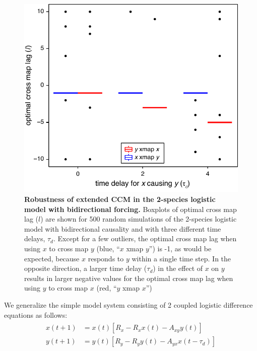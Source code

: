 \begin{figure}[!ht]
\begin{center}\includegraphics{fig_lag_2sp_delay_rand.pdf}\end{center}
\caption[Robustness of extended CCM in the 2-species logistic model with bidirectional forcing.]{\textbf{Robustness of extended CCM in the 2-species logistic model with bidirectional forcing.}\newline
Boxplots of optimal cross map lag ($l$) are shown for 500 random simulations of the 2-species logistic model with bidirectional causality and with three different time delays, $\tau_d$. Except for a few outliers, the optimal cross map lag when using $x$ to cross map $y$ (blue, ``$x$ xmap $y$'') is -1, as would be expected, because $x$ responds to $y$ within a single time step. In the opposite direction, a larger time delay ($\tau_d$) in the effect of $x$ on $y$ results in larger negative values for the optimal cross map lag when using $y$ to cross map $x$ (red, ``$y$ xmap $x$'')}
\label{fig_lag_2sp_delay_rand}
\end{figure}

We generalize the simple model system consisting of 2 coupled logistic difference equations as follows:
\begin{align}
\label{eqn_2sp_delay_rand}
\begin{split}
x(t+1) &= x(t) \left[R_x - R_x x(t) - A_{xy} y(t)\right]\\
y(t+1) &= y(t) \left[R_y - R_y y(t) - A_{yx} x(t-\tau_d)\right]
\end{split}
\end{align}

